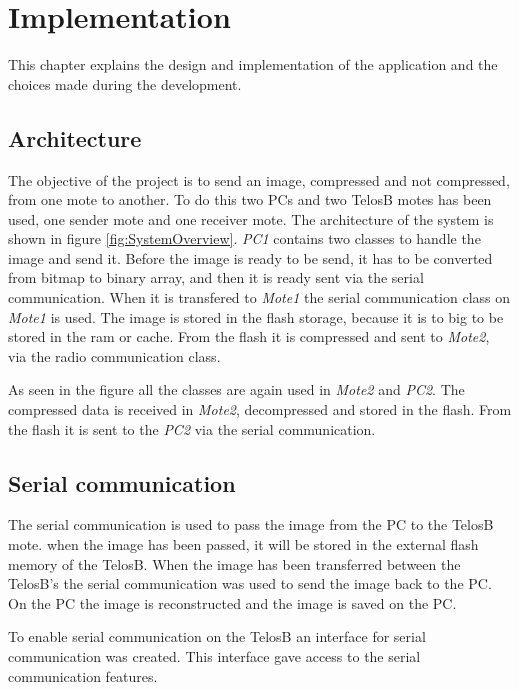 \chapter{Implementation}
\label{chp:impl}

This chapter explains the design and implementation of the application and the choices made during the development.

\section{Architecture}
The objective of the project is to send an image, compressed and not compressed, from one mote to another. To do this two PCs and two TelosB motes has been used, one sender mote and one receiver mote. The architecture of the system is shown in figure \ref{fig:SystemOverview}. \emph{PC1} contains two classes to handle the image and send it. Before the image is ready to be send, it has to be converted from bitmap to binary array, and then it is ready sent via the serial communication. When it is transfered to \emph{Mote1} the serial communication class on \emph{Mote1} is used. The image is stored in the flash storage, because it is to big to be stored in the ram or cache. From the flash it is compressed and sent to \emph{Mote2}, via the radio communication class.


As seen in the figure all the classes are again used in \emph{Mote2} and \emph{PC2}. The compressed data is received in \emph{Mote2}, decompressed and stored in the flash. From the flash it is sent to the \emph{PC2} via the serial communication. 

\section{Serial communication}
The serial communication is used to pass the image from the PC to the TelosB mote. when the image has been passed, it will be stored in the external flash memory of the TelosB. When the image has been transferred between the TelosB's the serial communication was used to send the image back to the PC. On the PC the image is reconstructed and the image is saved on the PC.

To enable serial communication on the TelosB an interface for serial communication was created. This interface gave access to the serial communication features. 

